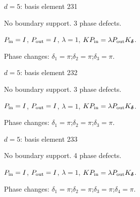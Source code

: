 \vfill
{\footnotesize\texttt{}}
\newpage
{}
{\Large $d=5$: basis element 231}\par
No boundary support. 3 phase defects.
\begin{center}
\end{center}
\vspace{-1mm}
$P_{\rm in}=I$, \quad $P_{\rm out}=I$, \quad $\lambda=1$, \qquad $K P_{\rm in}=\lambda P_{\rm out}K_{\boldsymbol\delta}$.
\par\smallskip\begin{minipage}{.98\linewidth}\small Phase changes: $\delta_{1}=\pi$;\quad $\delta_{2}=\pi$;\quad $\delta_{3}=\pi$.\end{minipage}
\vfill
{\footnotesize\texttt{}}
\newpage
{}
{\Large $d=5$: basis element 232}\par
No boundary support. 3 phase defects.
\begin{center}
\end{center}
\vspace{-1mm}
$P_{\rm in}=I$, \quad $P_{\rm out}=I$, \quad $\lambda=1$, \qquad $K P_{\rm in}=\lambda P_{\rm out}K_{\boldsymbol\delta}$.
\par\smallskip\begin{minipage}{.98\linewidth}\small Phase changes: $\delta_{1}=\pi$;\quad $\delta_{2}=\pi$;\quad $\delta_{3}=\pi$.\end{minipage}
\vfill
{\footnotesize\texttt{}}
\newpage
{}
{\Large $d=5$: basis element 233}\par
No boundary support. 4 phase defects.
\begin{center}
\end{center}
\vspace{-1mm}
$P_{\rm in}=I$, \quad $P_{\rm out}=I$, \quad $\lambda=1$, \qquad $K P_{\rm in}=\lambda P_{\rm out}K_{\boldsymbol\delta}$.
\par\smallskip\begin{minipage}{.98\linewidth}\small Phase changes: $\delta_{1}=\pi$;\quad $\delta_{2}=\pi$;\quad $\delta_{3}=\pi$;\quad $\delta_{4}=\pi$.\end{minipage}
\vfill
{\footnotesize\texttt{}}
\newpage
